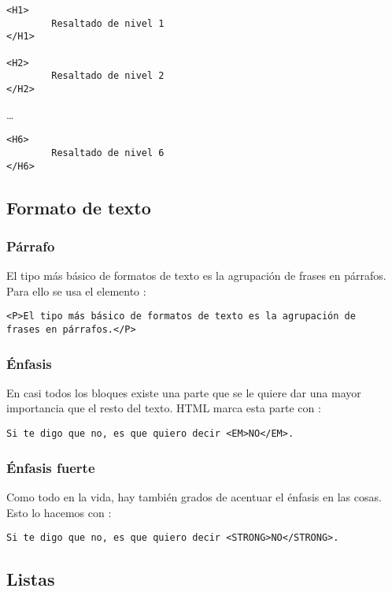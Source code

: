 \begin{verbatim}
<H1>
        Resaltado de nivel 1
</H1>

<H2>
        Resaltado de nivel 2
</H2>
\end{verbatim}
\dots
\begin{verbatim}
<H6>
        Resaltado de nivel 6
</H6>
\end{verbatim}


\subsection{Formato de texto}

\subsubsection*{Párrafo}

El tipo más básico de formatos de  texto es la agrupación de frases en
párrafos. Para ello se usa el elemento :

\begin{verbatim}
<P>El tipo más básico de formatos de texto es la agrupación de
frases en párrafos.</P>
\end{verbatim}

\subsubsection*{Énfasis}

En casi todos  los bloques existe una  parte que se le  quiere dar una
mayor importancia  que el resto del  texto. HTML marca esta  parte con
:

\begin{verbatim}
Si te digo que no, es que quiero decir <EM>NO</EM>.
\end{verbatim}

\noindent
\subsubsection*{Énfasis fuerte}

Como todo en la vida, hay también grados de acentuar el énfasis en las
cosas. Esto lo hacemos con :

\begin{verbatim}
Si te digo que no, es que quiero decir <STRONG>NO</STRONG>.
\end{verbatim}

\subsection{Listas}

